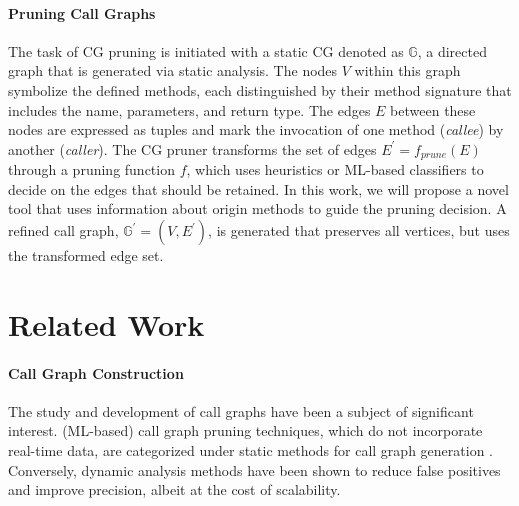 \paragraph{Pruning Call Graphs}
The task of CG pruning is initiated with a static CG denoted as $\mathbb{G}$, a directed graph that is generated via static analysis.
The nodes $V$ within this graph symbolize the defined methods, each distinguished by their method signature that includes the name, parameters, and return type.
The edges $E$ between these nodes are expressed as tuples and mark the invocation of one method (\emph{callee}) by another (\emph{caller}).
The CG pruner transforms the set of edges $E^\prime = f_{prune}(E)$ through a pruning function $f$, which uses heuristics or ML-based classifiers to decide on the edges that should be retained.
In this work, we will propose a novel tool that uses information about origin methods to guide the pruning decision.
A refined call graph, $\mathbb{G}^\prime= (V, E^\prime)$, is generated that preserves all vertices, but uses the transformed edge set.

\section{Related Work}
\paragraph{Call Graph Construction}
The study and development of call graphs have been a subject of significant interest. (ML-based) call graph pruning techniques, which do not incorporate real-time data, are categorized under static methods for call graph generation \cite{murphy1998empirical, reif2019judge, sui2020recall}. Conversely, dynamic analysis methods \cite{xie2002empirical, hejderup2018software} have been shown to reduce false positives and improve precision, albeit at the cost of scalability.

